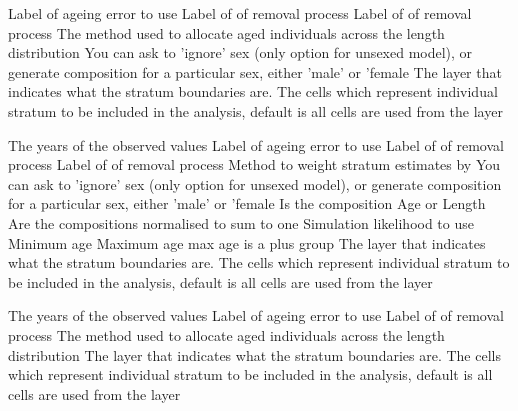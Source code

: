  {Label of ageing error to use}
 {Label of of removal process}
 {Label of of removal process}
 {The method used to allocate aged individuals across the length distribution}
 {You can ask to 'ignore' sex (only option for unsexed model), or generate composition for a particular sex, either 'male' or 'female}
 {The layer that indicates what the stratum boundaries are.}
 {The cells which represent individual stratum to be included in the analysis, default is all cells are used from the layer}
\par\textbf{}\par
{} {The years of the observed values}
 {Label of ageing error to use}
 {Label of of removal process}
 {Label of of removal process}
 {Method to weight stratum estimates by}
 {You can ask to 'ignore' sex (only option for unsexed model), or generate composition for a particular sex, either 'male' or 'female}
 {Is the composition Age or Length}
 {Are the compositions normalised to sum to one}
 {Simulation likelihood to use}
 {Minimum age}
 {Maximum age}
 {max age is a plus group}
 {The layer that indicates what the stratum boundaries are.}
 {The cells which represent individual stratum to be included in the analysis, default is all cells are used from the layer}
\par\textbf{}\par
{} {The years of the observed values}
 {Label of ageing error to use}
 {Label of of removal process}
 {The method used to allocate aged individuals across the length distribution}
 {The layer that indicates what the stratum boundaries are.}
 {The cells which represent individual stratum to be included in the analysis, default is all cells are used from the layer}
\par\textbf{}\par
